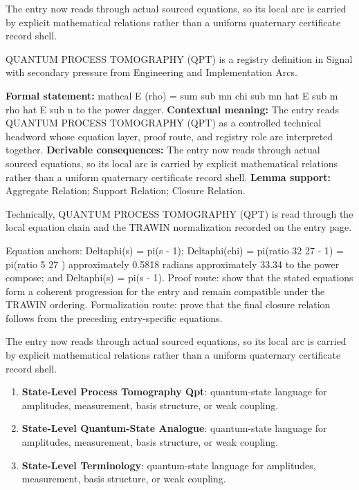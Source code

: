 The entry now reads through actual sourced equations, so its local arc is carried by explicit mathematical relations rather than a uniform quaternary certificate record shell.
\clearpage


\begingroup\small
{}
QUANTUM PROCESS TOMOGRAPHY (QPT) is a registry definition in Signal with secondary pressure from Engineering and Implementation Arcs.

\begingroup\footnotesize\setlength{\emergencystretch}{3em}\sloppy
\textbf{Formal statement:} mathcal E (rho) = sum sub mn chi sub mn hat E sub m rho hat E sub n to the power dagger. \textbf{Contextual meaning:} The entry reads QUANTUM PROCESS TOMOGRAPHY (QPT) as a controlled technical headword whose equation layer, proof route, and registry role are interpreted together. \textbf{Derivable consequences:} The entry now reads through actual sourced equations, so its local arc is carried by explicit mathematical relations rather than a uniform quaternary certificate record shell. \textbf{Lemma support:} Aggregate Relation; Support Relation; Closure Relation.\par
\endgroup

Technically, QUANTUM PROCESS TOMOGRAPHY (QPT) is read through the local equation chain and the TRAWIN normalization recorded on the entry page.

Equation anchors: Deltaphi(s) = pi(s - 1); Deltaphi(chi) = pi(ratio 32 27 - 1) = pi(ratio 5 27 ) approximately 0.5818 radians approximately 33.34 to the power compose; and Deltaphi(s) = pi(s - 1). Proof route: show that the stated equations form a coherent progression for the entry and remain compatible under the TRAWIN ordering. Formalization route: prove that the final closure relation follows from the preceding entry-specific equations.

The entry now reads through actual sourced equations, so its local arc is carried by explicit mathematical relations rather than a uniform quaternary certificate record shell.
\endgroup

\begin{enumerate}[leftmargin=1.6em,itemsep=6pt,topsep=4pt]
\item \textbf{State-Level Process Tomography Qpt}: quantum-state language for amplitudes, measurement, basis structure, or weak coupling.
\item \textbf{State-Level Quantum-State Analogue}: quantum-state language for amplitudes, measurement, basis structure, or weak coupling.
\item \textbf{State-Level Terminology}: quantum-state language for amplitudes, measurement, basis structure, or weak coupling.
\end{enumerate}


